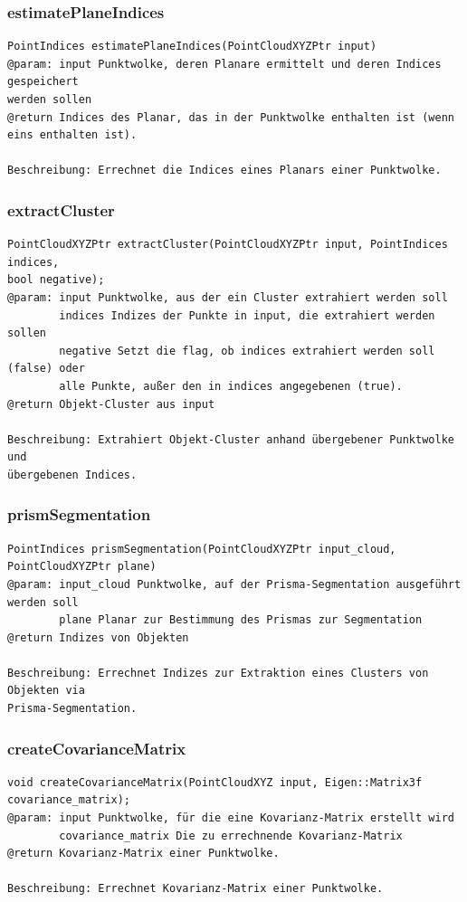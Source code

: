 \documentclass{suturo}
\begin{document}
\subsubsection{estimatePlaneIndices}
\begin{verbatim}
PointIndices estimatePlaneIndices(PointCloudXYZPtr input)
@param: input Punktwolke, deren Planare ermittelt und deren Indices gespeichert
werden sollen
@return Indices des Planar, das in der Punktwolke enthalten ist (wenn eins enthalten ist).

Beschreibung: Errechnet die Indices eines Planars einer Punktwolke.
\end{verbatim}\label{func:estimateplaneindices}

\subsubsection{extractCluster}
\begin{verbatim}
PointCloudXYZPtr extractCluster(PointCloudXYZPtr input, PointIndices indices, 
bool negative);
@param: input Punktwolke, aus der ein Cluster extrahiert werden soll
		indices Indizes der Punkte in input, die extrahiert werden sollen
		negative Setzt die flag, ob indices extrahiert werden soll (false) oder
		alle Punkte, außer den in indices angegebenen (true).
@return Objekt-Cluster aus input

Beschreibung: Extrahiert Objekt-Cluster anhand übergebener Punktwolke und
übergebenen Indices.
\end{verbatim}\label{func:extractcluster}

\subsubsection{prismSegmentation}
\begin{verbatim}
PointIndices prismSegmentation(PointCloudXYZPtr input_cloud, PointCloudXYZPtr plane)
@param: input_cloud Punktwolke, auf der Prisma-Segmentation ausgeführt werden soll
		plane Planar zur Bestimmung des Prismas zur Segmentation
@return Indizes von Objekten

Beschreibung: Errechnet Indizes zur Extraktion eines Clusters von Objekten via
Prisma-Segmentation.
\end{verbatim}\label{func:prismsegmentation}

\subsubsection{createCovarianceMatrix}
\begin{verbatim}
void createCovarianceMatrix(PointCloudXYZ input, Eigen::Matrix3f covariance_matrix);
@param: input Punktwolke, für die eine Kovarianz-Matrix erstellt wird
		covariance_matrix Die zu errechnende Kovarianz-Matrix
@return Kovarianz-Matrix einer Punktwolke.

Beschreibung: Errechnet Kovarianz-Matrix einer Punktwolke.
\end{verbatim}\label{func:createcovariancematrix}
\end{document}
